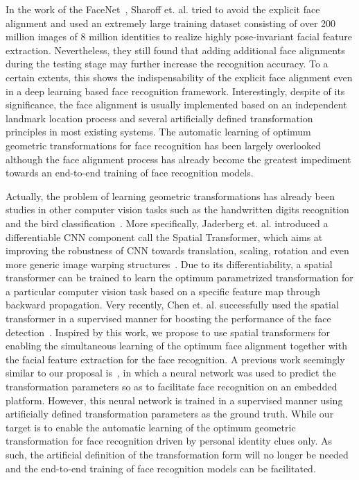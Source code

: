 \documentclass[10pt,twocolumn,letterpaper]{article}
\begin{document}
In the work of the FaceNet~\cite{schroff2015facenet}, Sharoff et. al. tried to avoid the explicit face alignment and used an extremely large training dataset consisting of over 200 million images of 8 million identities to realize highly pose-invariant facial feature extraction. 
Nevertheless, they still found that adding additional face alignments during the testing stage may further increase the recognition accuracy. 
To a certain extents, this shows the indispensability of the explicit face alignment even in a deep learning based face recognition framework. 
Interestingly, despite of its significance, the face alignment is usually implemented based on an independent landmark location process and several artificially defined transformation principles in most existing systems. 
The automatic learning of optimum geometric transformations for face recognition has been largely overlooked although the  face alignment process has already become the greatest impediment towards an end-to-end training of face recognition models.

Actually, the problem of learning geometric transformations has already been studies in other computer vision tasks such as the handwritten digits recognition and the bird classification~\cite{jaderberg2015spatial}.  
More specifically, Jaderberg et. al. introduced a differentiable CNN component call the Spatial Transformer, which aims at improving the robustness of CNN towards translation, scaling, rotation and even more generic image warping structures~\cite{jaderberg2015spatial}. 
Due to its differentiability, a spatial transformer can be trained to learn the optimum parametrized transformation for a particular computer vision task based on a specific feature map through backward propagation. 
Very recently, Chen et. al. successfully used the spatial transformer in a supervised manner for boosting the performance of the face detection~\cite{chen2016supervised}. 
Inspired by this work, we propose to use spatial transformers for enabling the simultaneous learning of the optimum face alignment together with the facial feature extraction for the face recognition. 
A previous work seemingly similar to our proposal is~\cite{tadmor2016learning}, in which a neural network was used to predict the transformation parameters so as to facilitate face recognition on an embedded platform. 
However, this neural network is trained in a supervised manner using artificially defined transformation parameters as the ground truth. 
While our target is to enable the automatic learning of the optimum geometric transformation for face recognition driven by personal identity clues only.
As such, the artificial definition of the transformation form will no longer be needed and the end-to-end training of face recognition models can be facilitated.
\end{document}
